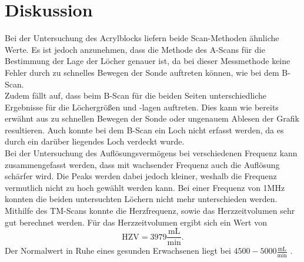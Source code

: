 \section{Diskussion}
Bei der Untersuchung des Acrylblocks liefern beide Scan-Methoden ähnliche Werte. Es ist jedoch anzunehmen, dass die Methode des A-Scans für die Bestimmung der Lage der Löcher genauer ist, da bei dieser Messmethode keine Fehler durch zu schnelles Bewegen der Sonde auftreten können, wie bei dem B-Scan.\\
Zudem fällt auf, dass beim B-Scan für die beiden Seiten unterschiedliche Ergebnisse für die Löchergrößen und -lagen auftreten. Dies kann wie bereits erwähnt aus zu schnellen Bewegen der Sonde oder ungenauem Ablesen der Grafik resultieren. Auch konnte bei dem B-Scan ein Loch nicht erfasst werden, da es durch ein darüber liegendes Loch verdeckt wurde. 
\\
Bei der Untersuchung des Auflösungsvermögens bei verschiedenen Frequenz kann zusammengefasst werden, dass mit wachsender Frequenz auch die Auflösung schärfer wird. Die Peaks werden dabei jedoch kleiner, weshalb die Frequenz vermutlich nicht zu hoch gewählt werden kann. Bei einer Frequenz von 1MHz konnten die beiden untersuchten Löchern nicht mehr unterschieden werden.
\\
Mithilfe des TM-Scans konnte die Herzfrequenz, sowie das Herzzeitvolumen sehr gut berechnet werden. 
Für das Herzzeitvolumen ergibt sich ein Wert von
\begin{equation*}
	\text{HZV} = 3979 \frac{\text{mL}}{\text{min}}  .
\end{equation*}
Der Normalwert in Ruhe eines gesunden Erwachsenen liegt bei $4500-5000 \frac{\text{mL}}{\text{min}}$ \cite{3}.